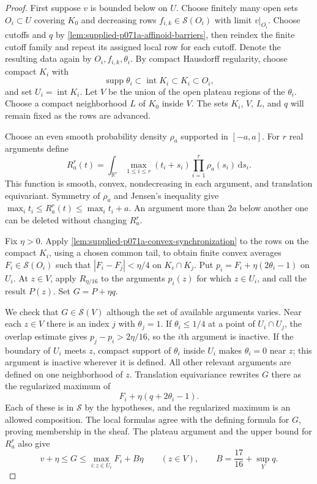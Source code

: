 \begin{proof}
First suppose $v$ is bounded below on $U$. Choose finitely many open sets $O_i\subset U$ covering $K_0$ and decreasing rows $f_{i,k}\in\mathscr{S}(O_i)$ with limit $v|_{O_i}$. Choose cutoffs and $q$ by \cref{lem:supplied-p071a-affinoid-barriers}, then reindex the finite cutoff family and repeat its assigned local row for each cutoff. Denote the resulting data again by $O_i,f_{i,k},\theta_i$. By compact Hausdorff regularity, choose compact $K_i$ with
\[
\operatorname{supp}\theta_i\subset\operatorname{int}K_i\subset K_i\subset O_i,
\]
and set $U_i=\operatorname{int}K_i$. Let $V$ be the union of the open plateau regions of the $\theta_i$. Choose a compact neighborhood $L$ of $K_0$ inside $V$. The sets $K_i$, $V$, $L$, and $q$ will remain fixed as the rows are advanced.

Choose an even smooth probability density $\rho_a$ supported in $[-a,a]$. For $r$ real arguments define
\[
R_a^r(t)=\int_{\mathbb{R}^r}\max_{1\leq i\leq r}(t_i+s_i)\prod_{i=1}^r\rho_a(s_i)\,\mathrm{d}s_i.
\]
This function is smooth, convex, nondecreasing in each argument, and translation equivariant. Symmetry of $\rho_a$ and Jensen's inequality give $\max_i t_i\leq R_a^r(t)\leq\max_i t_i+a$. An argument more than $2a$ below another one can be deleted without changing $R_a^r$.

Fix $\eta>0$. Apply \cref{lem:supplied-p071a-convex-synchronization} to the rows on the compact $K_i$, using a chosen common tail, to obtain finite convex averages $F_i\in\mathscr{S}(O_i)$ such that $|F_i-F_j|<\eta/4$ on $K_i\cap K_j$. Put $p_i=F_i+\eta(2\theta_i-1)$ on $U_i$. At $z\in V$, apply $R_{\eta/16}$ to the arguments $p_i(z)$ for which $z\in U_i$, and call the result $P(z)$. Set $G=P+\eta q$.

We check that $G\in\mathscr{S}(V)$ although the set of available arguments varies. Near each $z\in V$ there is an index $j$ with $\theta_j=1$. If $\theta_i\leq1/4$ at a point of $U_i\cap U_j$, the overlap estimate gives $p_j-p_i>2\eta/16$, so the $i$th argument is inactive. If the boundary of $U_i$ meets $z$, compact support of $\theta_i$ inside $U_i$ makes $\theta_i=0$ near $z$; this argument is inactive wherever it is defined. All other relevant arguments are defined on one neighborhood of $z$. Translation equivariance rewrites $G$ there as the regularized maximum of
\[
F_i+\eta(q+2\theta_i-1).
\]
Each of these is in $\mathscr{S}$ by the hypotheses, and the regularized maximum is an allowed composition. The local formulas agree with the defining formula for $G$, proving membership in the sheaf. The plateau argument and the upper bound for $R_a^r$ also give
\begin{equation}
\label{eq:supplied-p071a-gluing-bounds}
v+\eta\leq G\leq\max_{i:z\in U_i}F_i+B\eta
\qquad(z\in V),\qquad B=\frac{17}{16}+\sup_Yq.
\end{equation}


\end{proof}
